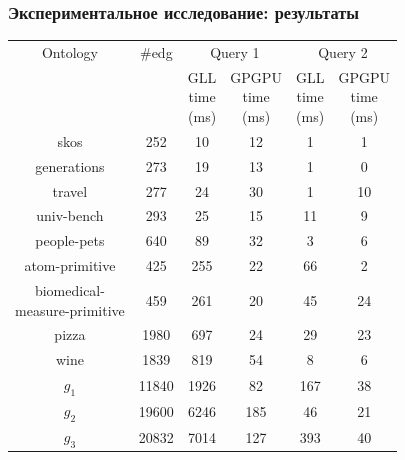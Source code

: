 \documentclass[xcolor=table,aspectratio=169]{beamer}
\begin{document}
\begin{frame}[fragile]
\transwipe[direction=90]
\frametitle{Экспериментальное исследование: результаты}
\centering
{}
\begin{tabular}{  c | c | c | c | c | c }
Ontology & \#edg & \multicolumn{2}{c|}{Query 1} & \multicolumn{2}{c}{Query 2} \\
\cline{3-6}
& & \shortstack{GLL \\ time \\ (ms)} & \shortstack{GPGPU \\ time \\ (ms)}  & \shortstack{GLL \\ time \\ (ms)} & \shortstack{GPGPU \\ time \\ (ms)} \\
\hline 
\hline
skos        & 252    & 10   & 12  & 1   & 1 \\
generations & 273    & 19   & 13  & 1   & 0 \\
travel      & 277    & 24   & 30  & 1   & 10 \\
univ-bench  & 293    & 25   & 15  & 11  & 9 \\
people-pets & 640    & 89   & 32  & 3   & 6 \\
atom-primitive 
            & 425    & 255  & 22  & 66  & 2 \\
\shortstack{biomedical- \\ measure-primitive} 
            & 459    & 261  & 20  & 45  & 24 \\
pizza       & 1980   & 697  & 24  & 29  & 23 \\
wine        & 1839   & 819  & 54  & 8   & 6 \\
$g_{1}$     & 11840  & 1926 & 82  & 167 & 38\\
$g_{2}$     & 19600  & 6246 & 185 & 46  & 21\\
$g_{3}$     & 20832  & 7014 & 127 & 393 & 40\\

\end{tabular}

\end{frame}
\end{document}
